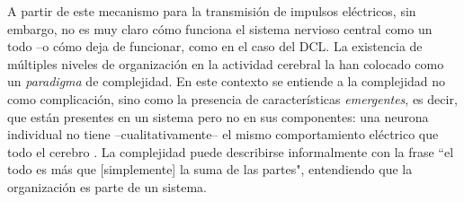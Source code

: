 \documentclass[12pt,letterpaper]{book}
\begin{document}
A partir de este mecanismo para la transmisión de impulsos eléctricos, sin embargo, no es muy claro cómo funciona el sistema nervioso central como un todo --o cómo deja de funcionar, como en el caso del DCL.
%
La existencia de múltiples niveles de organización en la actividad cerebral la han colocado como un \textit{paradigma} de complejidad.
En este contexto se entiende a la complejidad no como complicación, sino como la presencia de características \textit{emergentes}, es decir, que están presentes en un sistema pero no en sus componentes: una neurona individual no tiene --cualitativamente-- el mismo comportamiento eléctrico que todo el cerebro \cite{Werner09}.
%
La complejidad puede describirse informalmente con la frase ``el todo es más que [simplemente] la suma de las partes", entendiendo que la organización es parte de un sistema.
\end{document}
